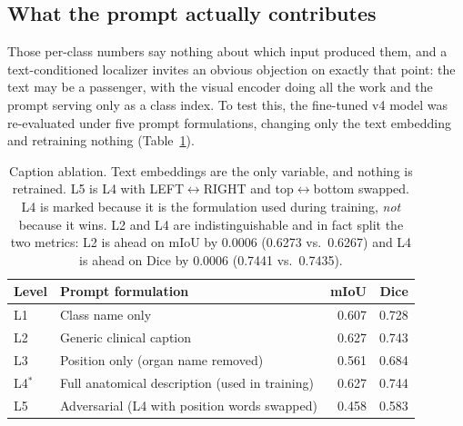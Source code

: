 \subsection{What the prompt actually contributes}
\label{sec:results:ablation}

Those per-class numbers say nothing about which input produced them, and a
text-conditioned localizer invites an obvious objection on exactly that point:
the text may be a passenger, with the visual encoder doing all the work and the
prompt serving only as a class index. To test this, the fine-tuned v4 model was
re-evaluated under five prompt formulations, changing only the text embedding
and retraining nothing (Table~\ref{tab:captions}).

\begin{table}[t]
\centering
\caption{Caption ablation. Text embeddings are the only variable, and nothing
is retrained. L5 is L4 with LEFT$\leftrightarrow$RIGHT and
top$\leftrightarrow$bottom swapped.
L4 is marked because it is the formulation used during training, \emph{not}
because it wins. L2 and L4 are indistinguishable and in fact split the two
metrics: L2 is ahead on mIoU by 0.0006 (0.6273 vs.\ 0.6267) and L4 is ahead on
Dice by 0.0006 (0.7441 vs.\ 0.7435).}
\label{tab:captions}
\begin{tabular}{llrr}
\toprule
Level & Prompt formulation & mIoU & Dice \\
\midrule
L1 & Class name only                                  & 0.607 & 0.728 \\
L2 & Generic clinical caption                         & 0.627 & 0.743 \\
L3 & Position only (organ name removed)               & 0.561 & 0.684 \\
L4$^{*}$ & Full anatomical description (used in training) & 0.627 & 0.744 \\
L5 & Adversarial (L4 with position words swapped)     & 0.458 & 0.583 \\
\bottomrule
\end{tabular}
\end{table}

